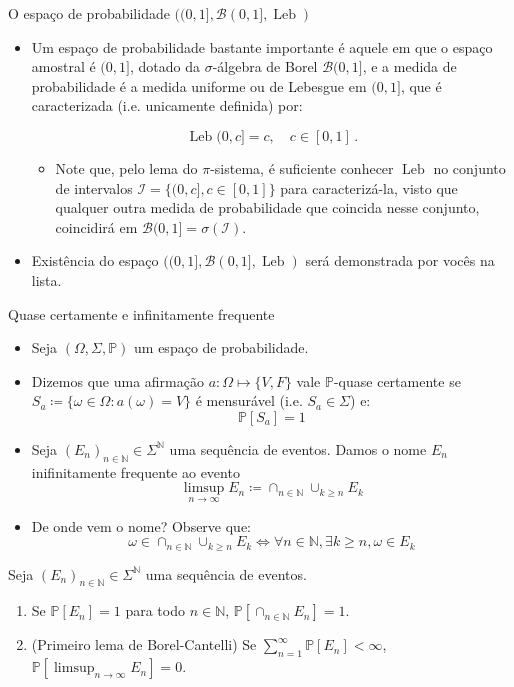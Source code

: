 \documentclass[11pt]{beamer}
\begin{document}
\begin{frame}{O espaço de probabilidade $((0,1],\mathcal{B}(0,1], \operatorname{Leb})$}
\begin{itemize}
	\item Um espaço de probabilidade bastante importante é aquele em que o espaço amostral é $(0,1]$, dotado da $\sigma$-álgebra de Borel $\mathcal{B}(0,1]$, e a medida de probabilidade é a {\color{red}medida uniforme ou de Lebesgue} em $(0,1]$, que é {\color{blue}caracterizada} (i.e. unicamente definida) por:
	
	$$\operatorname{Leb}(0,c] = c,\quad c \in [0,1]\, .$$
	\begin{itemize}
		\item Note que, pelo lema do $\pi$-sistema, é suficiente conhecer $\operatorname{Leb}$ no conjunto de intervalos $\mathcal{I} = \{(0,c], c \in [0,1]\}$ para caracterizá-la, visto que qualquer outra medida de probabilidade que coincida nesse conjunto, coincidirá em $\mathcal{B}(0,1] = \sigma(\mathcal{I})$.
	\end{itemize}
	\item {\color{orange}Existência} do espaço $((0,1],\mathcal{B}(0,1], \operatorname{Leb})$ será demonstrada por vocês na lista.
\end{itemize}
\end{frame}

\begin{frame}{Quase certamente e infinitamente frequente}
\begin{itemize}
	\item Seja $(\Omega, \Sigma,\mathbb{P})$ um espaço de probabilidade.
	\item Dizemos que uma afirmação $a: \Omega \mapsto \{V,F\}$ vale $\mathbb{P}$-quase certamente se $S_a \coloneqq \{\omega \in \Omega: a(\omega)=V\}$ é mensurável (i.e. $S_a \in \Sigma$) e:
	$$\mathbb{P}[S_a] = 1$$
	\item Seja $(E_n)_{n \in \mathbb{N}} \in \Sigma^{\mathbb{N}}$ uma sequência de eventos. Damos o nome {\color{red}$E_n$ inifinitamente frequente} ao evento
	$$\limsup_{n \to \infty} E_n \coloneqq \cap_{n \in \mathbb{N}}  \cup_{k\geq n}E_k$$
	\item De onde vem o nome? Observe que:
	$$ \omega \in \cap_{n \in \mathbb{N}}  \cup_{k\geq n}E_k \iff \forall n \in \mathbb{N}, \exists k \geq n, \omega \in E_k$$
\end{itemize}
\vspace{-1em}
	\begin{lemma}
	Seja $(E_n)_{n \in \mathbb{N}} \in \Sigma^{\mathbb{N}} $ uma sequência de eventos.
	\begin{enumerate}
		\item Se $\mathbb{P}[E_n]=1 $ para todo $n \in \mathbb{N}$, $\mathbb{P}[\cap_{n \in \mathbb{N}}E_n]=1$.
		\item (Primeiro lema de Borel-Cantelli) Se $\sum_{n=1}^\infty \mathbb{P}[E_n] < \infty$, $\mathbb{P}[\limsup_{n \to \infty} E_n] = 0$.
	\end{enumerate}
\end{lemma}
\end{frame}
\end{document}
